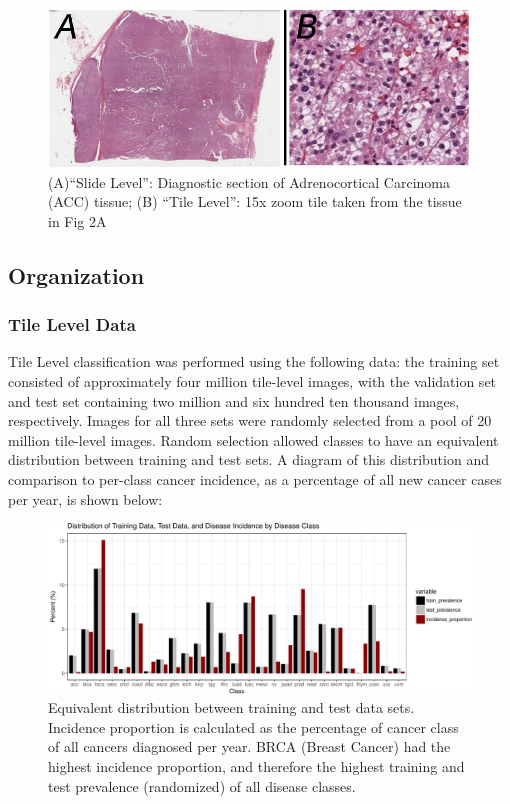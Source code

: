 \documentclass[12pt,]{article}
\begin{document}
\begin{figure}[H]

{\centering \includegraphics{figure/graphics-unnamed-chunk-3-1} 

}

\caption{(A)“Slide Level”: Diagnostic section of Adrenocortical Carcinoma (ACC) tissue; (B) “Tile Level”: 15x zoom tile taken from the tissue in Fig 2A}\label{fig:unnamed-chunk-3}
\end{figure}

\subsection{Organization}\label{organization}

\subsubsection{Tile Level Data}\label{tile-level-data}

Tile Level classification was performed using the following data: the
training set consisted of approximately four million tile-level images,
with the validation set and test set containing two million and six
hundred ten thousand images, respectively. Images for all three sets
were randomly selected from a pool of 20 million tile-level images.
Random selection allowed classes to have an equivalent distribution
between training and test sets. A diagram of this distribution and
comparison to per-class cancer incidence, as a percentage of all new
cancer cases per year, is shown below:

\begin{figure}[H]

{\centering \includegraphics{figure/graphics-unnamed-chunk-4-1} 

}

\caption{Equivalent distribution between training and test data sets. Incidence proportion is calculated as the percentage of cancer class of all cancers diagnosed per year. BRCA (Breast Cancer) had the highest incidence proportion, and therefore the highest training and test prevalence (randomized) of all disease classes.}\label{fig:unnamed-chunk-4}
\end{figure}
\end{document}
